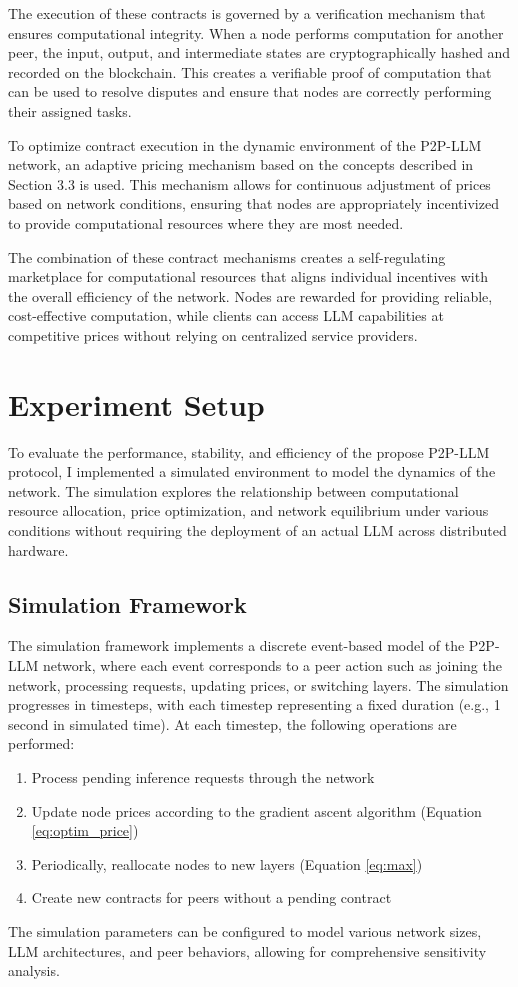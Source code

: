 \documentclass[preprint,twoside,11pt]{article}
\begin{document}
The execution of these contracts is governed by a verification mechanism that ensures computational integrity. When a node performs computation for another peer, the input, output, and intermediate states are cryptographically hashed and recorded on the blockchain. This creates a verifiable proof of computation that can be used to resolve disputes and ensure that nodes are correctly performing their assigned tasks.

To optimize contract execution in the dynamic environment of the P2P-LLM network, an adaptive pricing mechanism based on the concepts described in Section 3.3 is used. This mechanism allows for continuous adjustment of prices based on network conditions, ensuring that nodes are appropriately incentivized to provide computational resources where they are most needed.

The combination of these contract mechanisms creates a self-regulating marketplace for computational resources that aligns individual incentives with the overall efficiency of the network. Nodes are rewarded for providing reliable, cost-effective computation, while clients can access LLM capabilities at competitive prices without relying on centralized service providers.

\section{Experiment Setup}

To evaluate the performance, stability, and efficiency of the propose P2P-LLM protocol, I implemented a simulated environment
to model the dynamics of the network.
The simulation explores the relationship between computational resource allocation, price optimization, and network equilibrium under various conditions without requiring the deployment of an actual LLM across distributed hardware.

\subsection{Simulation Framework}
The simulation framework implements a discrete event-based model of the P2P-LLM network, where each event corresponds to a peer action such as joining the network, processing requests, updating prices, or switching layers. The simulation progresses in timesteps, with each timestep representing a fixed duration (e.g., 1 second in simulated time). At each timestep, the following operations are performed:
\begin{enumerate}
	\item Process pending inference requests through the network
	\item Update node prices according to the gradient ascent algorithm (Equation \ref{eq:optim_price})
	\item Periodically, reallocate nodes to new layers (Equation \ref{eq:max})
	\item Create new contracts for peers without a pending contract
\end{enumerate}
The simulation parameters can be configured to model various network sizes, LLM architectures, and peer behaviors, allowing for comprehensive sensitivity analysis.
\end{document}
